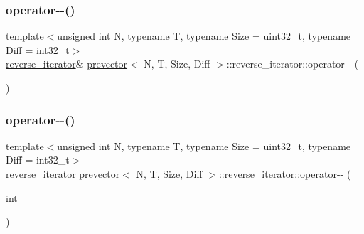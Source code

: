 \subsubsection{\texorpdfstring{operator-\/-\/()}{operator--()}\hspace{0.1cm}{\footnotesize\ttfamily [1/2]}}
{\footnotesize\ttfamily template$<$unsigned int N, typename T, typename Size = uint32\+\_\+t, typename Diff = int32\+\_\+t$>$ \\
\mbox{\hyperlink{classprevector_1_1reverse__iterator}{reverse\+\_\+iterator}}\& \mbox{\hyperlink{classprevector}{prevector}}$<$ N, T, Size, Diff $>$\+::reverse\+\_\+iterator\+::operator-\/-\/ (\begin{DoxyParamCaption}{ }\end{DoxyParamCaption})\hspace{0.3cm}{\ttfamily [inline]}}

\mbox{\label{classprevector_1_1reverse__iterator_af7b715f1ac105425675557654af85d49}} 
\subsubsection{\texorpdfstring{operator-\/-\/()}{operator--()}\hspace{0.1cm}{\footnotesize\ttfamily [2/2]}}
{\footnotesize\ttfamily template$<$unsigned int N, typename T, typename Size = uint32\+\_\+t, typename Diff = int32\+\_\+t$>$ \\
\mbox{\hyperlink{classprevector_1_1reverse__iterator}{reverse\+\_\+iterator}} \mbox{\hyperlink{classprevector}{prevector}}$<$ N, T, Size, Diff $>$\+::reverse\+\_\+iterator\+::operator-\/-\/ (\begin{DoxyParamCaption}\item[{int}]{ }\end{DoxyParamCaption})\hspace{0.3cm}{\ttfamily [inline]}}

\mbox{\label{classprevector_1_1reverse__iterator_a453be8c12070833336dbcd0187893492}} 
